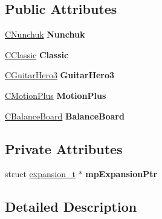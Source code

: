 \subsection*{Public Attributes}
\begin{DoxyCompactItemize}
\item 
\hypertarget{class_c_expansion_device_a9a30f45df41f2e0457fe3f57c0f0f53e}{\hyperlink{class_c_nunchuk}{C\-Nunchuk} {\bfseries Nunchuk}}\label{class_c_expansion_device_a9a30f45df41f2e0457fe3f57c0f0f53e}

\item 
\hypertarget{class_c_expansion_device_a2d84fd3250518acbcb28c733277a9931}{\hyperlink{class_c_classic}{C\-Classic} {\bfseries Classic}}\label{class_c_expansion_device_a2d84fd3250518acbcb28c733277a9931}

\item 
\hypertarget{class_c_expansion_device_a9ebd876c248d2b0242bf06181735a4e1}{\hyperlink{class_c_guitar_hero3}{C\-Guitar\-Hero3} {\bfseries Guitar\-Hero3}}\label{class_c_expansion_device_a9ebd876c248d2b0242bf06181735a4e1}

\item 
\hypertarget{class_c_expansion_device_a49310ff81cc6b9ac43839cb7f596cfa2}{\hyperlink{class_c_motion_plus}{C\-Motion\-Plus} {\bfseries Motion\-Plus}}\label{class_c_expansion_device_a49310ff81cc6b9ac43839cb7f596cfa2}

\item 
\hypertarget{class_c_expansion_device_aae5430823c39c8e8b836200b9b29ac42}{\hyperlink{class_c_balance_board}{C\-Balance\-Board} {\bfseries Balance\-Board}}\label{class_c_expansion_device_aae5430823c39c8e8b836200b9b29ac42}

\end{DoxyCompactItemize}
\subsection*{Private Attributes}
\begin{DoxyCompactItemize}
\item 
\hypertarget{class_c_expansion_device_ae4e0e3d3a4c395b84d85bb7f178e30e7}{struct \hyperlink{structexpansion__t}{expansion\-\_\-t} $\ast$ {\bfseries mp\-Expansion\-Ptr}}\label{class_c_expansion_device_ae4e0e3d3a4c395b84d85bb7f178e30e7}

\end{DoxyCompactItemize}


\subsection{Detailed Description}


